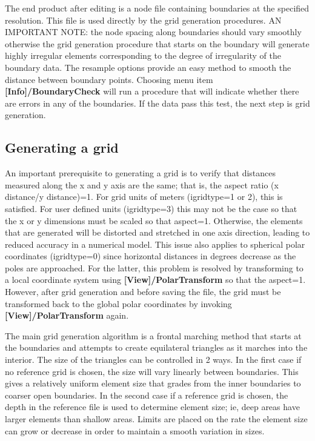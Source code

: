 \documentclass{article}
\begin{document}
 The end product after editing is a node file containing boundaries at the specified resolution. This file is used directly
 by the grid generation procedures. AN IMPORTANT NOTE: the node spacing along boundaries should vary smoothly
 otherwise the grid generation procedure that starts on the boundary will generate highly irregular elements 
corresponding to the degree of irregularity of the boundary data. The resample options provide an easy method to
smooth the distance between boundary points. Choosing menu item  \textbf{[Info]/BoundaryCheck} will run a 
procedure that will indicate whether there are errors in any of the boundaries. If the data pass this test, the next
step is grid generation.

\subsection{Generating a grid}

An important prerequisite to generating a grid is to verify that distances measured along the x and y axis are the same;
that is, the aspect ratio (x distance/y distance)=1. For grid units of meters (igridtype=1 or 2), this is satisfied. For user
defined units (igridtype=3) this may not be the case so that the x or y dimensions must be scaled so that aspect=1.
Otherwise, the elements that are generated will be distorted and stretched in one axis direction, leading to reduced
accuracy in a numerical model. This issue also applies to spherical polar coordinates (igridtype=0) since horizontal 
distances in degrees decrease as the poles are approached. For the latter, this problem is resolved by transforming
to a local coordinate system using \textbf{[View]/PolarTransform} so that the aspect=1. However, after grid generation
and before saving the file, the grid must be transformed back to the global polar coordinates by invoking
\textbf{[View]/PolarTransform} again. 

The main grid generation algorithm is a frontal marching method that starts at the boundaries and attempts to
create equilateral triangles as it marches into the interior.  The size of the triangles can be controlled in 2 ways.
In the first case if no reference grid is chosen, the size will vary linearly between boundaries. This gives a relatively 
uniform element size that grades from the inner boundaries to coarser open boundaries. In the second case if a
reference grid is chosen, the depth in the reference file is used to determine element size; ie, deep areas have larger
elements than shallow areas. Limits are placed on the rate the element size can grow or decrease in order to maintain a
smooth variation in sizes.
\end{document}
